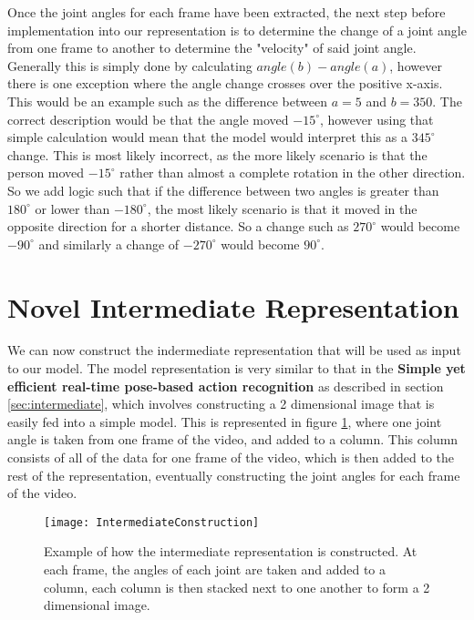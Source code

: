 Once the joint angles for each frame have been extracted, the next step before implementation into our representation is to determine the change of a joint angle from one frame to another to determine the "velocity" of said joint angle. Generally this is simply done by calculating $angle(b) - angle(a)$, however there is one exception where the angle change crosses over the positive x-axis. This would be an example such as the difference between $a = 5$ and $b = 350$. The correct description would be that the angle moved $-15^\circ$, however using that simple calculation would mean that the model would interpret this as a $345^\circ$ change. This is most likely incorrect, as the more likely scenario is that the person moved $-15^\circ$ rather than almost a complete rotation in the other direction. So we add logic such that if the difference between two angles is greater than $180^\circ$ or lower than $-180^\circ$, the most likely scenario is that it moved in the opposite direction for a shorter distance. So a change such as $270^\circ$ would become $-90^\circ$ and similarly a change of $-270^\circ$ would become $90^\circ$.

\section{Novel Intermediate Representation}

We can now construct the indermediate representation that will be used as input to our model. The model representation is very similar to that in the \textbf{Simple yet efficient real-time pose-based action recognition} \cite{simple_yet_efficient} as described in section \ref{sec:intermediate}, which involves constructing a 2 dimensional image that is easily fed into a simple model. This is represented in figure \ref{fig:intermediate-construction}, where one joint angle is taken from one frame of the video, and added to a column. This column consists of all of the data for one frame of the video, which is then added to the rest of the representation, eventually constructing the joint angles for each frame of the video.

\begin{figure}[ht]
	\texttt{[image: IntermediateConstruction]}
	\centering
	\caption{Example of how the intermediate representation is constructed. At each frame, the angles of each joint are taken and added to a column, each column is then stacked next to one another to form a 2 dimensional image.}
	\label{fig:intermediate-construction}
\end{figure}

